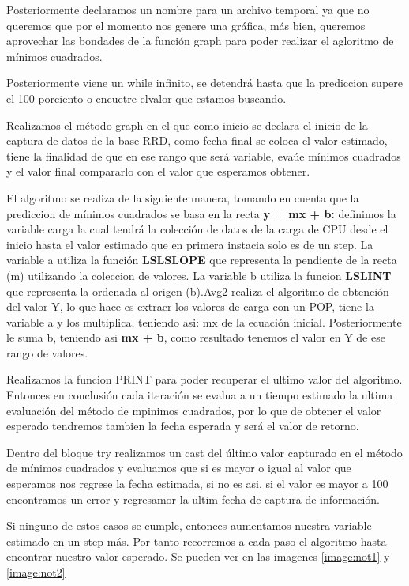 \begin{itemize}
Posteriormente declaramos un nombre para un archivo temporal ya que no queremos que por el momento nos genere una gráfica, más bien, queremos aprovechar las bondades de la función graph para poder realizar el agloritmo de mínimos cuadrados.

Posteriormente viene un while infinito, se detendrá hasta que la prediccion supere el 100 porciento o encuetre elvalor que estamos buscando.

Realizamos el método graph en el que como inicio se declara el inicio de la captura de datos de la base RRD, como fecha final se coloca el valor estimado, tiene la finalidad de que en ese rango que será variable, evaúe mínimos cuadrados y el valor final compararlo con el valor que esperamos obtener.

El algoritmo se realiza de la siguiente manera, tomando en cuenta que la prediccion de mínimos cuadrados se basa en la recta \textbf{y = mx + b:}
definimos la variable carga la cual tendrá la colección de datos de la carga de CPU desde el inicio hasta el valor estimado que en primera instacia solo es de un step.
La variable a utiliza la función \textbf{LSLSLOPE} que representa la pendiente de la recta (m) utilizando la coleccion de valores.
La variable b utiliza la funcion \textbf{LSLINT} que representa la ordenada al origen (b).Avg2 realiza el algoritmo de obtención del valor Y, lo que hace es extraer los valores de carga con un POP, tiene la variable a y los multiplica, teniendo asi: mx de la ecuación inicial.
Posteriormente le suma b, teniendo asi \textbf{mx + b}, como resultado tenemos el valor en Y de ese rango de valores.

Realizamos la funcion PRINT para poder recuperar el ultimo valor del algoritmo. Entonces en conclusión cada iteración se evalua a un tiempo estimado la ultima evaluación del método de mpinimos cuadrados, por lo que de obtener el valor esperado tendremos tambien la fecha esperada y será el valor de retorno.

Dentro del bloque try realizamos un cast del último valor capturado en el método de mínimos cuadrados y evaluamos que si es mayor o igual al valor que esperamos nos regrese la fecha estimada, si no es asi, si el valor es mayor a 100 encontramos un error y regresamor la ultim fecha de captura de información.

Si ninguno de estos casos se cumple, entonces aumentamos nuestra variable estimado en un step más. Por tanto recorremos a cada paso el algoritmo hasta encontrar nuestro valor esperado.
Se pueden ver en las imagenes \ref{image:not1} y \ref{image:not2}  


\end{itemize}
